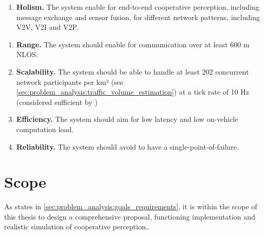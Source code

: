 \begin{enumerate}[F-C1:\ \ ]
	\item \textbf{Holism.} The system enable for end-to-end cooperative perception, including message exchange and sensor fusion, for different network patterns, including V2V, V2I and V2P.
	\end{enumerate}
\begin{enumerate}[NF-C1:]
	\item \textbf{Range.} The system should enable for communication over at least 600 m NLOS.
	\item \textbf{Scalability.} The system should be able to handle at least 202 concurrent network participants per km² (see \autoref{sec:problem_analysis:traffic_volume_estimation}) at a tick rate of 10 Hz (considered sufficient by \cite{Rauch2011, Thandavarayan2019})
	\item \textbf{Efficiency.} The system should aim for low latency and low on-vehicle computation load.
	\item \textbf{Reliability.} The system should avoid to have a single-point-of-failure. 
\end{enumerate}

\section{Scope}
\label{sec:problem_analysis:scope}
As states in \autoref{sec:problem_analysis:goals_requirements}, it is within the scope of this thesis to design a comprehensive proposal, functioning implementation and realistic simulation of cooperative perception..

